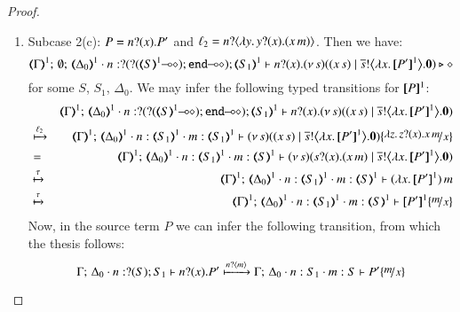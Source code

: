 \begin{proof}
\begin{enumerate}[1.]
	\item	Subcase 2(c): $P = n ? (x) . P'$ and $\ell_2 = n ? \langle \lambda y.\,y ? (x) . (x\, {m}) \rangle$.
		Then we have:
%
		\[
			\mapt{\Gamma}^{1};\, \emptyset;\, \mapt{\Delta_0}^{1} \cat 
			n: \btinp{\lhot{\btinp{\lhot{\tmap{S}{1}}}\tinact}} \tmap{S_1}{1}
			\proves
			\binp{n}{x} \newsp{s}{(\appl{x}{s})
			\Par 
			\bbout{\dual{s}}{\abs{x}{\pmap{P'}{1}}} \inact}
			\hastype \Proc
		\]
%
		for some $S$, $S_1$, $\Delta_0$.
		We may infer the following typed transitions for $[\!\![P]\!\!]^1$:
%
		\begin{eqnarray*}
			& & 
			\mapt{\Gamma}^{1};\, %
			\mapt{\Delta_0}^{1} \cat 
			n: \btinp{\lhot{\btinp{\lhot{\tmap{S}{1}}}\tinact}} \tmap{S_1}{1}
			\proves
			\binp{n}{x} \newsp{s}{(\appl{x}{s}) 
							\Par 
							\bbout{\dual{s}}{\abs{x}{\pmap{P'}{1}}} \inact} \\
			& \hby{\ell_2} & 
			\mapt{\Gamma}^{1};\, %
			\mapt{\Delta_0}^{1} \cat 
			n:\tmap{S_1}{1}
			\cat m:\tmap{S_1}{1}
			\proves
			\newsp{s}{(\appl{x}{s}) 
				\Par 
				\bbout{\dual{s}}{\abs{x}{\pmap{P'}{1}}} \inact} \subst{\abs{z}\binp{z}{x}\appl{x}{m}}{x} \\
			& = & 
			\mapt{\Gamma}^{1};\, %
			\mapt{\Delta_0}^{1} 
			\cat n:\tmap{S_1}{1}
			\cat m:\tmap{S}{1}
			\proves
			\newsp{s}{\binp{s}{x}(\appl{x}{m}) 
				\Par 
				\bbout{\dual{s}}{\abs{x}{\pmap{P'}{1}}} \inact}  \\
			& \hby{\tau} & 
			\mapt{\Gamma}^{1};\, %
			\mapt{\Delta_0}^{1} 
			\cat n:\tmap{S_1}{1}
			\cat m:\tmap{S}{1}
			\proves
			\appl{(\abs{x}{\pmap{P'}{1}})}{m}   \\
			& \hby{\tau} & 
			\mapt{\Gamma}^{1};\, %
			\mapt{\Delta_0}^{1} 
			\cat n:\tmap{S_1}{1}
			\cat m:\tmap{S}{1}
			\proves
			\pmap{P'}{1}\subst{m}{x}   
		\end{eqnarray*}
%
		Now, in the source term $P$ we can infer the following transition, from which the thesis follows:
%
		\[
			\Gamma;\,  \Delta_0 \cat n:\btinp{S} S_1 \proves \binp{n}{x} P'
			\hby{\bactinp{n}{m}} 
			\Gamma;\,  \Delta_0 \cat n: S_1 \cat m: S \proves P'\subst{m}{x}
		\]
%
		

%
\end{enumerate}
\end{proof}



